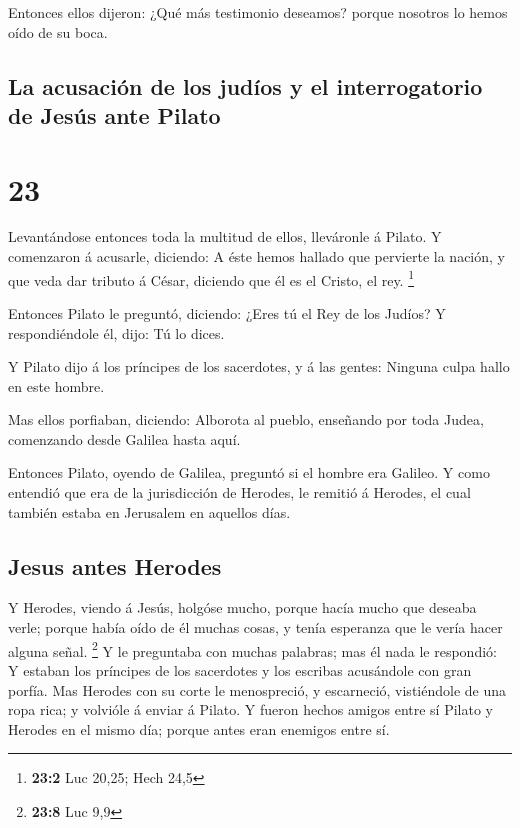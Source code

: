  Entonces ellos dijeron: ¿Qué más testimonio deseamos?
porque nosotros lo hemos oído de su boca.

\hypertarget{la-acusaciuxf3n-de-los-juduxedos-y-el-interrogatorio-de-jesuxfas-ante-pilato}{%
\subsection{La acusación de los judíos y el interrogatorio de Jesús ante
Pilato}\label{la-acusaciuxf3n-de-los-juduxedos-y-el-interrogatorio-de-jesuxfas-ante-pilato}}

\hypertarget{section-22}{%
\section{23}\label{section-22}}

 Levantándose entonces toda la multitud de ellos,
lleváronle á Pilato.  Y comenzaron á acusarle, diciendo: A
éste hemos hallado que pervierte la nación, y que veda dar tributo á
César, diciendo que él es el Cristo, el rey. \footnote{\textbf{23:2} Luc
  20,25; Hech 24,5}

 Entonces Pilato le preguntó, diciendo: ¿Eres tú el Rey de
los Judíos? Y respondiéndole él, dijo: Tú lo dices.

 Y Pilato dijo á los príncipes de los sacerdotes, y á las
gentes: Ninguna culpa hallo en este hombre.

 Mas ellos porfiaban, diciendo: Alborota al pueblo,
enseñando por toda Judea, comenzando desde Galilea hasta aquí.

 Entonces Pilato, oyendo de Galilea, preguntó si el hombre
era Galileo.  Y como entendió que era de la jurisdicción
de Herodes, le remitió á Herodes, el cual también estaba en Jerusalem en
aquellos días.

\hypertarget{jesus-antes-herodes}{%
\subsection{Jesus antes Herodes}\label{jesus-antes-herodes}}

 Y Herodes, viendo á Jesús, holgóse mucho, porque hacía
mucho que deseaba verle; porque había oído de él muchas cosas, y tenía
esperanza que le vería hacer alguna señal. \footnote{\textbf{23:8} Luc
  9,9}  Y le preguntaba con muchas palabras; mas él nada
le respondió:  Y estaban los príncipes de los sacerdotes
y los escribas acusándole con gran porfía.  Mas Herodes
con su corte le menospreció, y escarneció, vistiéndole de una ropa rica;
y volvióle á enviar á Pilato.  Y fueron hechos amigos
entre sí Pilato y Herodes en el mismo día; porque antes eran enemigos
entre sí.

